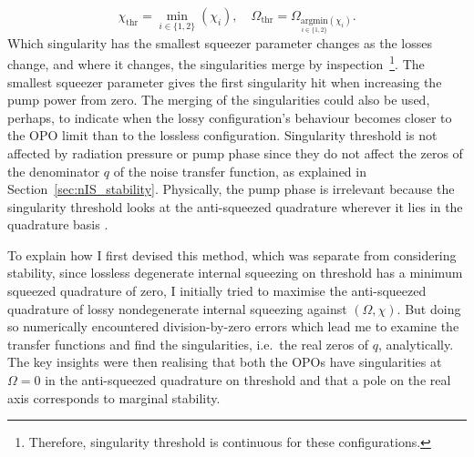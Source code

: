 \begin{equation}
\chi_\text{thr}=\min_{i\in\{1,2\}}(\chi_i),\quad\Omega_\text{thr}=\Omega_{\underset{i\in\{1,2\}}{\text{argmin}}(\chi_i)}.
\end{equation}
Which singularity has the smallest squeezer parameter changes as the losses change, and where it changes, the singularities merge by inspection~\footnote{Therefore, singularity threshold is continuous for these configurations.}. The smallest squeezer parameter gives the first singularity hit when increasing the pump power from zero. The merging of the singularities could also be used, perhaps, to indicate when the lossy configuration's behaviour becomes closer to the OPO limit than to the lossless configuration.
Singularity threshold is not affected by radiation pressure or pump phase since they do not affect the zeros of the denominator $q$ of the noise transfer function, as explained in Section~\ref{sec:nIS_stability}. Physically, the pump phase is irrelevant because the singularity threshold looks at the anti-squeezed quadrature wherever it lies in the quadrature basis .

To explain how I first devised this method, which was separate from considering stability, since lossless degenerate internal squeezing on threshold has a minimum squeezed quadrature of zero, I initially tried to maximise the anti-squeezed quadrature of lossy nondegenerate internal squeezing against $(\Omega,\chi)$. But doing so numerically encountered division-by-zero errors which lead me to examine the transfer functions and find the singularities, i.e.\ the real zeros of $q$, analytically. The key insights were then realising that both the OPOs have singularities at $\Omega=0$ in the anti-squeezed quadrature on threshold and that a pole on the real axis corresponds to marginal stability.

